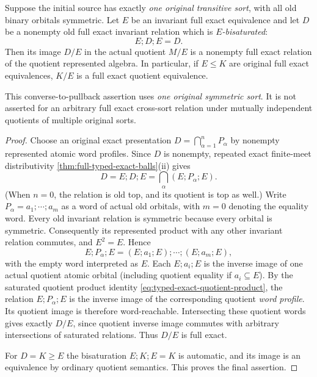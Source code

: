 \begin{lemma}
\label{lem:one-original-sort-exact-descent}
Suppose the initial source has exactly \emph{one
original transitive sort}, with all old binary
orbitals symmetric. Let $E$ be an invariant
full exact equivalence and let $D$ be a
nonempty old full exact invariant relation
which is \emph{$E$-bisaturated}:
\[
                         E;D;E=D.
\]
Then its image $D/E$ in the actual quotient
$M/E$ is a nonempty full exact relation
of the quotient represented algebra.
In particular, if $E\le K$ are original
full exact equivalences, $K/E$ is a full
exact quotient equivalence.

This converse-to-pullback assertion uses
\emph{one original symmetric sort}.
It is not asserted for an arbitrary full
exact cross-sort relation under mutually
independent quotients of multiple original
sorts.
\end{lemma}
\begin{proof}
Choose an original exact presentation
$D=\bigcap_{\alpha=1}^n P_\alpha$ by
nonempty represented atomic word profiles.
Since $D$ is nonempty, repeated exact
finite-meet distributivity
\cref{thm:full-typed-exact-balls}(ii)
gives
\[
 D=E;D;E=\bigcap_\alpha(E;P_\alpha;E).
 \tag{TQ5}\label{eq:one-sort-exact-descent}
\]
(When $n=0$, the relation is old top,
and its quotient is top as well.)
Write $P_\alpha=a_1;\cdots;a_m$ as
a word of actual old orbitals, with
$m=0$ denoting the equality word.
Every old invariant relation is symmetric
because every orbital is symmetric.
Consequently its represented product
with any other invariant relation
commutes, and $E^2=E$. Hence
\[
 E;P_\alpha;E=
 (E;a_1;E);\cdots;(E;a_m;E),
\]
with the empty word interpreted as
$E$. Each $E;a_i;E$ is the inverse image
of one actual quotient atomic orbital
(including quotient equality if $a_i\subseteq E$).
By the saturated quotient product identity
\eqref{eq:typed-exact-quotient-product}, the
relation $E;P_\alpha;E$ is the inverse image
of the corresponding quotient \emph{word
profile}. Its quotient image is therefore
word-reachable. Intersecting these quotient
words gives exactly $D/E$, since quotient
inverse image commutes with arbitrary
intersections of saturated relations.
Thus $D/E$ is full exact.

For $D=K\ge E$ the bisaturation
$E;K;E=K$ is automatic, and its image
is an equivalence by ordinary quotient
semantics. This proves the final assertion.
\end{proof}

